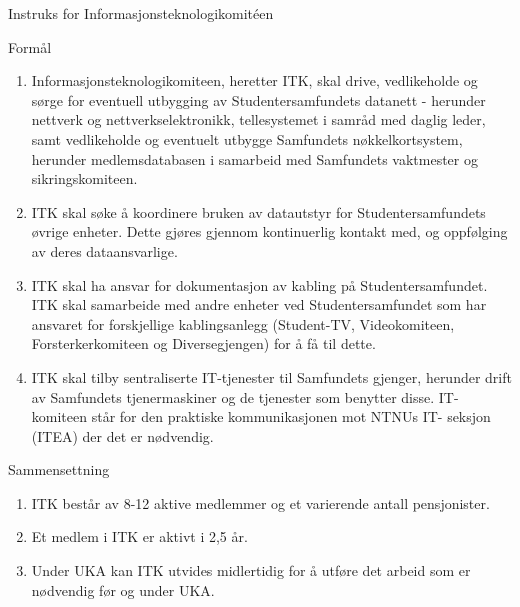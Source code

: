 \begin{instruks*}{Instruks for Informasjonsteknologikomit\'een}

    \begin{instruksledd}{Formål}
        \begin{enumerate}
            \item Informasjonsteknologikomiteen, heretter ITK, skal drive, vedlikeholde og sørge for
                eventuell utbygging av
                Studentersamfundets datanett - herunder nettverk og nettverkselektronikk, tellesystemet i
                samråd med daglig
                leder, samt vedlikeholde og eventuelt utbygge Samfundets nøkkelkortsystem, herunder
                medlemsdatabasen i
                samarbeid med Samfundets vaktmester og sikringskomiteen.
            \item  ITK skal søke å koordinere bruken av datautstyr for Studentersamfundets øvrige
                enheter. Dette gjøres
                gjennom kontinuerlig kontakt med, og oppfølging av deres dataansvarlige.
            \item  ITK skal ha ansvar for dokumentasjon av kabling på Studentersamfundet. ITK skal
                samarbeide med andre
                enheter ved Studentersamfundet som har ansvaret for forskjellige kablingsanlegg
                (Student-TV, Videokomiteen, Forsterkerkomiteen og Diversegjengen) for å få til dette.
            \item  ITK skal tilby sentraliserte IT-tjenester til Samfundets gjenger, herunder drift av
                Samfundets tjenermaskiner
                og de tjenester som benytter disse. IT-komiteen står for den praktiske kommunikasjonen
                mot NTNUs IT-
                seksjon (ITEA) der det er nødvendig.
        \end{enumerate}
    \end{instruksledd}

    \begin{instruksledd}{Sammensettning}
        \begin{enumerate}
            \item ITK består av 8-12 aktive medlemmer og et varierende antall pensjonister.
            \item Et medlem i ITK er aktivt i 2,5 år.
            \item  Under UKA kan ITK utvides midlertidig for å utføre det arbeid som er nødvendig før og
            under UKA.
        \end{enumerate}
    \end{instruksledd}


\end{instruks*}
